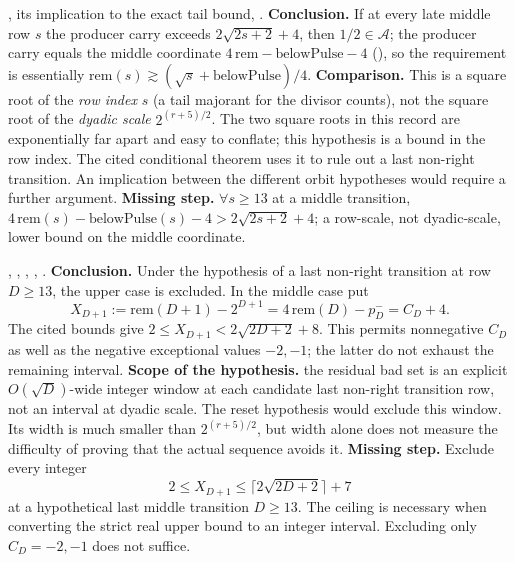 \begin{obs}
,
its implication to the exact tail bound,
.
\textbf{Conclusion.} If at every late middle row $s$ the producer carry exceeds $2\sqrt{2s+2}+4$, then
$1/2 \in \ensuremath{\mathcal A}$; the producer carry equals the middle coordinate
$4\,\mathrm{rem}-\mathrm{belowPulse}-4$
(), so the requirement is essentially
$\mathrm{rem}(s) \gtrsim (\sqrt{s}+\mathrm{belowPulse})/4$.
\textbf{Comparison.} This is a square root of the \emph{row index}
$s$ (a tail majorant for the divisor counts), not the square root of the \emph{dyadic scale}
$2^{(r+5)/2}$.  The two square roots in this record are exponentially far apart and easy to
conflate; this hypothesis is a bound in the row index.  The cited conditional theorem uses it to rule out a
last non-right transition.  An implication between the different orbit
hypotheses would require a further argument.
\textbf{Missing step.} $\forall s \ge 13$ at a middle transition, $4\,\mathrm{rem}(s) -
\mathrm{belowPulse}(s) - 4 > 2\sqrt{2s+2}+4$; a row-scale, not dyadic-scale, lower bound on the
middle coordinate.
\end{obs}

\begin{obs}
,
,
,
,
.
\textbf{Conclusion.} Under the hypothesis of a last non-right transition
at row $D\ge13$, the upper case is excluded.  In the middle case put
\[
 X_{D+1}:=\mathrm{rem}(D+1)-2^{D+1}
          =4\,\mathrm{rem}(D)-p_D^-=C_D+4.
\]
The cited bounds give $2\le X_{D+1}<2\sqrt{2D+2}+8$.
This permits nonnegative $C_D$ as well as the negative exceptional
values $-2,-1$; the latter do not exhaust the remaining interval.
\textbf{Scope of the hypothesis.} the residual bad set is an explicit
$O(\sqrt D)$-wide integer window at each candidate last non-right transition row, not an interval at dyadic
scale. The reset hypothesis would exclude this window.  Its width is much
smaller than $2^{(r+5)/2}$, but width alone does not measure the difficulty
of proving that the actual sequence avoids it.
\textbf{Missing step.} Exclude every integer
\[
 2\le X_{D+1}\le\bigl\lceil2\sqrt{2D+2}\bigr\rceil+7
\]
at a hypothetical last middle transition $D\ge13$.
The ceiling is necessary when converting the strict real upper bound
to an integer interval.  Excluding only $C_D=-2,-1$ does not suffice.
\end{obs}

